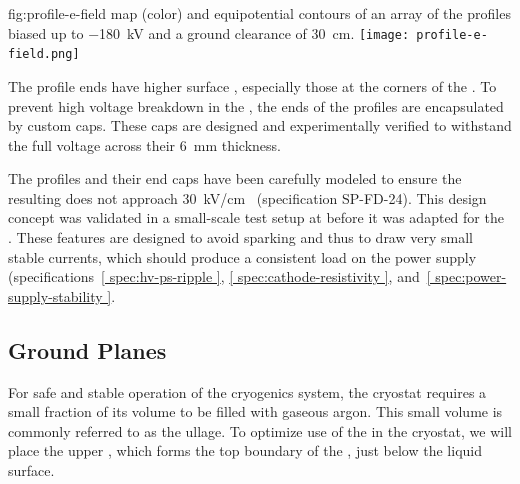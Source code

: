 \begin{dunefigure}
{fig:profile-e-field}
{\efield{} map (color) and equipotential contours of an array of the  profiles biased up to \SI{-180}{\kV} and a ground clearance of \SI{30}{\cm}.} %
\texttt{[image: profile-e-field.png]}
\end{dunefigure}

The profile ends have higher surface \efield{}, especially those at the corners of the . To prevent high voltage breakdown in the , the ends of the profiles are encapsulated by custom  caps.  These caps are designed and experimentally verified to withstand the full voltage across their \SI{6}{\milli\m} thickness. 

The profiles and their end caps have been carefully modeled to ensure the resulting \efield{}
 does not approach \SI{30}{\kV}/{cm}~\cite{Blatter:2014wua} (specification SP-FD-24). This design concept was validated in a small-scale test setup at  before it was adapted for the .  
These features are designed to avoid sparking and thus to draw very small stable currents, 
which should produce a consistent load on the power supply 
(specifications~\ref{ spec:hv-ps-ripple }, \ref{ spec:cathode-resistivity }, 
and~\ref{ spec:power-supply-stability }. %


\subsection{Ground Planes}
\label{sec:fdsp-hv-des-fc-gp}

For safe and stable operation of the  cryogenics system, the cryostat requires a small fraction of its volume to be filled with gaseous argon. This small volume is commonly referred to as the ullage. To optimize use of the  in the cryostat, we will place the upper , which forms the top boundary of the , just below the liquid surface.

